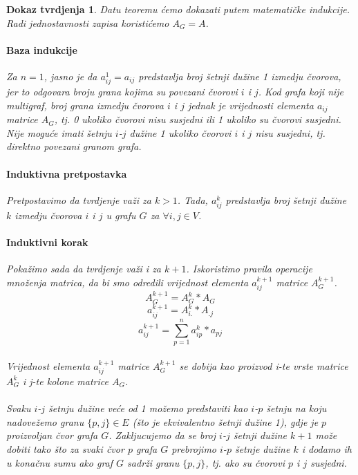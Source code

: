\documentclass[11pt]{article}
\newtheorem*{custom_proof}{Dokaz tvrdjenja}
\begin{document}
		\begin{custom_proof}
			Datu teoremu ćemo dokazati putem matematičke indukcije.  Radi jednostavnosti zapisa koristićemo $A_G = A$.
			
			\paragraph{Baza indukcije}
			Za $n=1$, jasno je da $a_{ij}^1 = a_{ij}$ predstavlja broj šetnji dužine 1 izmedju čvorova, jer to odgovara broju grana kojima su povezani čvorovi $i$ i $j$. 
			Kod grafa koji nije multigraf, broj grana izmedju čvorova $i$ i $j$ jednak je vrijednosti elementa $a_{ij}$ matrice $A_G$, tj. 0 ukoliko čvorovi nisu susjedni ili 1 ukoliko su čvorovi susjedni. 
			Nije moguće imati šetnju $i$-$j$ dužine 1 ukoliko čvorovi $i$ i $j$ nisu susjedni, tj. direktno povezani granom grafa. 
			
			\paragraph{Induktivna pretpostavka}
			Pretpostavimo da tvrdjenje važi za $k>1$.  Tada, $a_{ij}^k$ predstavlja broj šetnji dužine $k$ izmedju čvorova $i$ i $j$ u grafu $G$ za $\forall i,j \in V$. 
			
			\paragraph{Induktivni korak}
			Pokažimo sada da tvrdjenje važi i za $k+1$.
			Iskoristimo pravila operacije množenja matrica, da bi smo odredili vrijednost elementa $a_{ij}^{k+1}$ matrice $A_G^{k+1}$.  
			\[
				A_G^{k+1} = A_G^k * A_G
			\]
			\[
				a_{ij}^{k+1} = A_{i.}^k * A_{.j} 
			\]
			\begin{equation}
			a_{ij}^{k+1} = \sum_{p=1}^{n} a_{ip}^k * a_{pj}
			\label{eq:element}
			\end{equation}
		
			\paragraph{}
			Vrijednost elementa $a_{ij}^{k+1}$ matrice $A_G^{k+1}$ se dobija kao proizvod i-te vrste matrice $A_G^k$ i j-te kolone matrice $A_G$. 
			
			\paragraph{}
			Svaku $i$-$j$ šetnju dužine veće od 1 možemo predstaviti kao $i$-$p$ šetnju na koju nadovežemo granu $\{p,j\} \in E$ (što je ekvivalentno šetnji dužine 1), gdje je $p$ proizvoljan čvor grafa $G$. 
			Zakljucujemo da se broj $i$-$j$ šetnji dužine $k+1$ može dobiti tako što za svaki čvor $p$ grafa $G$ prebrojimo $i$-$p$ šetnje dužine $k$ i dodamo ih u konačnu sumu ako graf $G$ sadrži granu $\{p,j\}$,
			tj. ako su čvorovi $p$ i $j$ susjedni.
		

\end{custom_proof}
\end{document}
